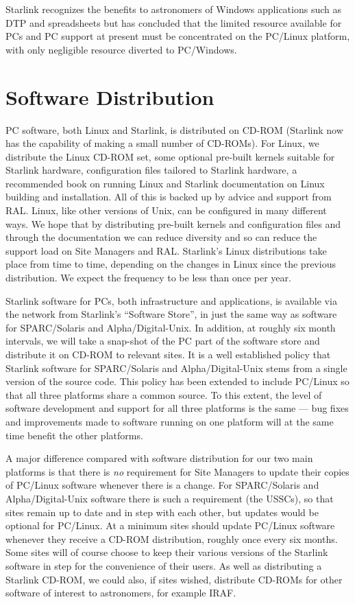 \documentclass[twoside,11pt]{article}
\begin{document}
Starlink recognizes the benefits to astronomers of Windows applications
such as DTP and spreadsheets but has concluded that the limited
resource available for PCs and PC support at present must be
concentrated on the PC/Linux platform, with only negligible resource
diverted to PC/Windows.

\section{Software Distribution}

PC software, both Linux and Starlink, is
distributed on CD-ROM (Starlink now has the capability of making a
small number of CD-ROMs).  For Linux, we distribute the Linux
CD-ROM set, some optional pre-built kernels suitable for Starlink
hardware, configuration files tailored to Starlink hardware, a
recommended book on running Linux and Starlink documentation on Linux
building and installation.  All of this is backed up by advice
and support from RAL.  Linux, like other versions of Unix, can be
configured in many different ways.   We hope that by distributing
pre-built kernels and configuration files and through the documentation
we can reduce diversity and so can reduce the support load on Site
Managers and RAL.  Starlink's Linux distributions take place
from time to time, depending on the changes in Linux since the previous
distribution.  We expect the frequency to be less than once per year.

Starlink software for PCs, both infrastructure and
applications, is available via the
network from Starlink's ``Software Store'', in just the same way as
software for SPARC/Solaris and Alpha/Digital-Unix.  In addition, at
roughly six month intervals, we will take a snap-shot of the PC
part of the software store and distribute it on CD-ROM to relevant
sites.  It is a well established policy that Starlink software for
SPARC/Solaris and Alpha/Digital-Unix stems from a single version of the
source code.  This policy has been extended to include
PC/Linux so that all three platforms share a common source.  To
this extent, the level of software development and support for all
three platforms is the same --- bug fixes and improvements made
to software running on one platform will at the same time benefit the
other platforms.

A major difference compared with software distribution for our two main
platforms is that there is {\em no} requirement for Site Managers to
update their copies of PC/Linux software whenever there is a change.
For SPARC/Solaris and Alpha/Digital-Unix software there is such a
requirement (the USSCs), so that sites remain up to date and in step
with each other,  but updates would be optional for PC/Linux.  
At a minimum sites should update PC/Linux software
whenever they receive a CD-ROM distribution, roughly once every six
months. Some sites will of course choose to keep their various versions of
the Starlink software in step for the convenience of their users.
As well as distributing a Starlink CD-ROM, we could also, if
sites wished, distribute CD-ROMs for other software of interest to
astronomers, for example IRAF.
\end{document}
